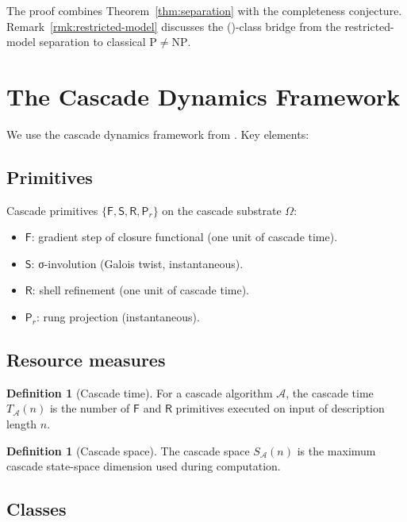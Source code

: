 \documentclass[11pt, a4paper]{amsart}
\theoremstyle{definition}
\newtheorem{definition}[theorem]{Definition}
\begin{document}
The proof combines Theorem~\ref{thm:separation} with the
completeness conjecture. Remark~\ref{rmk:restricted-model}
discusses the (\textgamma)-class bridge from the restricted-model
separation to classical $\mathrm{P} \neq \mathrm{NP}$.

\section{The Cascade Dynamics Framework}

We use the cascade dynamics framework from \cite{CascadeDynamics}.
Key elements:

\subsection{Primitives}

Cascade primitives $\{\mathsf{F}, \mathsf{S}, \mathsf{R}, \mathsf{P}_r\}$ on the
cascade substrate $\Omega$:
\begin{itemize}
\item $\mathsf{F}$: gradient step of closure functional (one unit of cascade time).
\item $\mathsf{S}$: σ-involution (Galois twist, instantaneous).
\item $\mathsf{R}$: shell refinement (one unit of cascade time).
\item $\mathsf{P}_r$: rung projection (instantaneous).
\end{itemize}

\subsection{Resource measures}

\begin{definition}[Cascade time]\label{def:time}
For a cascade algorithm $\mathcal{A}$, the cascade time $T_{\mathcal{A}}(n)$
is the number of $\mathsf{F}$ and $\mathsf{R}$ primitives executed on input of
description length $n$.
\end{definition}

\begin{definition}[Cascade space]\label{def:space}
The cascade space $S_{\mathcal{A}}(n)$ is the maximum cascade
state-space dimension used during computation.
\end{definition}

\subsection{Classes}
\end{document}
